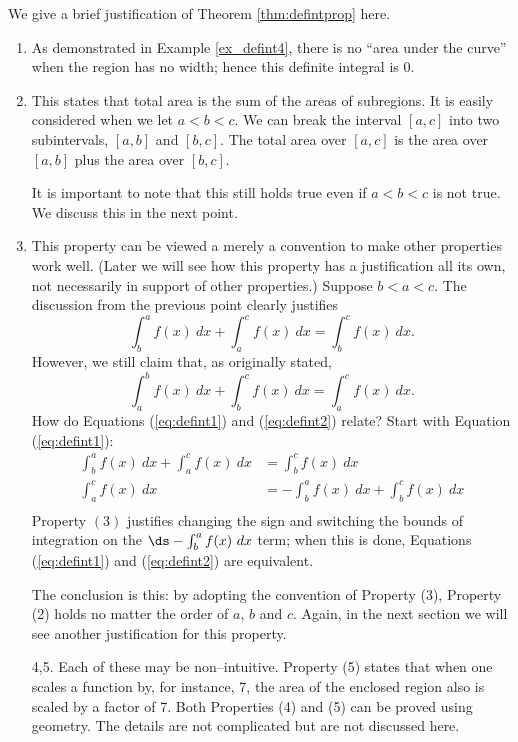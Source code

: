 We give a brief justification of Theorem \ref{thm:defintprop} here.
		\begin{enumerate}
		\item		As demonstrated in Example \ref{ex_defint4}, there is no ``area under the curve'' when the region has no width; hence this definite integral is 0.
		\item		This states that total area is the sum of the areas of subregions. It is easily considered when we let $a<b<c$. We can break the interval $[a,c]$ into two subintervals, $[a,b]$ and $[b,c]$. The total area over $[a,c]$ is the area over $[a,b]$ plus the area over $[b,c]$. 
		
		It is important to note that this still holds true even if $a<b<c$ is not true. We discuss this in the next point.
		\item		This property can be viewed a merely a convention to make other properties work well. (Later we will see how this property has a justification all its own, not necessarily in support of other properties.) Suppose $b<a<c$. The discussion from the previous point clearly justifies 
		\begin{equation}\int_b^a f(x)\ dx + \int_a^c f(x)\ dx = \int_b^c f(x)\ dx.\label{eq:defint1}\end{equation}
		However, we still claim that, as originally stated, 
		\begin{equation}\int_a^b f(x)\ dx + \int_b^c f(x)\ dx = \int_a^c f(x)\ dx.\label{eq:defint2}\end{equation}
		How do Equations (\ref{eq:defint1}) and (\ref{eq:defint2}) relate? Start with Equation (\ref{eq:defint1}):
		\begin{align*}
		\int_b^a f(x)\ dx + \int_a^c f(x)\ dx &= \int_b^c f(x)\ dx\\
		\int_a^c f(x)\ dx &= -\int_b^a f(x)\ dx + \int_b^c f(x)\ dx\\
		\end{align*}
Property $(3)$ justifies changing the sign and switching the bounds of integration on the $\ds -\int_b^a f(x)\ dx$ term; when this is done, Equations (\ref{eq:defint1}) and (\ref{eq:defint2}) are equivalent.

The conclusion is this: by adopting the convention of Property (3), Property (2) holds no matter the order of $a$, $b$ and $c$. Again, in the next section we will see another justification for this property.
	\item[4,5.]	Each of these may be non--intuitive. Property (5) states that when one scales a function by, for instance, 7, the area of the enclosed region also is scaled by a factor of 7. Both Properties (4) and (5)  can be proved using geometry. The details are not complicated but are not discussed here.
\end{enumerate}

